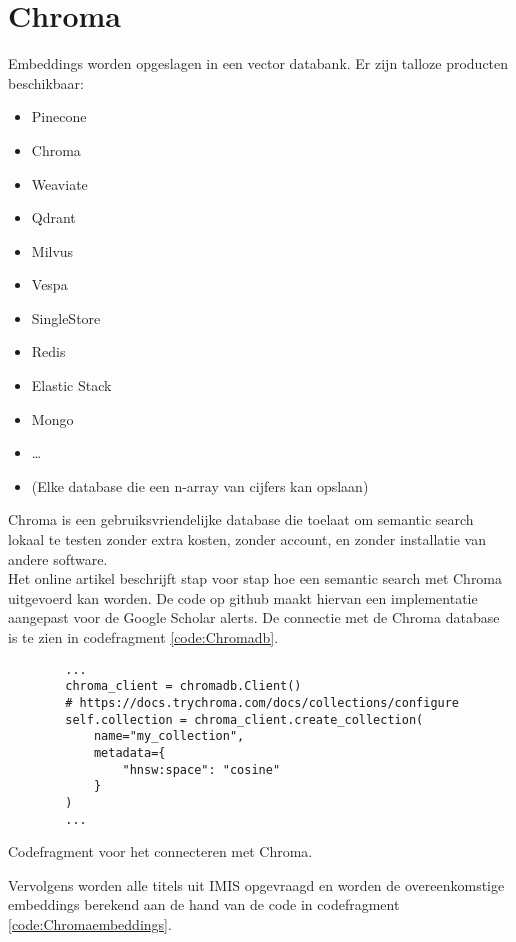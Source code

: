 \section{Chroma}
Embeddings worden opgeslagen in een vector databank. Er zijn talloze producten beschikbaar:
\begin{itemize}
    \item Pinecone
    \item Chroma
    \item Weaviate
    \item Qdrant
    \item Milvus
    \item Vespa
    \item SingleStore
    \item Redis
    \item Elastic Stack
    \item Mongo
    \item …
    \item (Elke database die een n-array van cijfers kan opslaan)
\end{itemize}
Chroma \autocite{Chroma2025} is een gebruiksvriendelijke database die toelaat om semantic search lokaal te testen zonder extra kosten, zonder account, en zonder installatie van andere software.\\
Het online artikel \textcite{Usechroma2025} beschrijft stap voor stap hoe een semantic search met Chroma uitgevoerd kan worden. 
De code op github \textcite{Depaepechroma2025} maakt hiervan een implementatie aangepast voor de Google Scholar alerts.
De connectie met de Chroma database is te zien in codefragment \ref{code:Chromadb}.
\begin{listing}
    \begin{verbatim}
        ...
        chroma_client = chromadb.Client()
        # https://docs.trychroma.com/docs/collections/configure
        self.collection = chroma_client.create_collection(
            name="my_collection",
            metadata={
                "hnsw:space": "cosine"
            }
        )
        ...
    \end{verbatim}
    \caption[Chroma codefragment]{Codefragment voor het connecteren met Chroma.}
    \label{code:Chromadb}
\end{listing}
Vervolgens worden alle titels uit IMIS opgevraagd en worden de overeenkomstige embeddings berekend aan de hand van de code in codefragment \ref{code:Chromaembeddings}.
